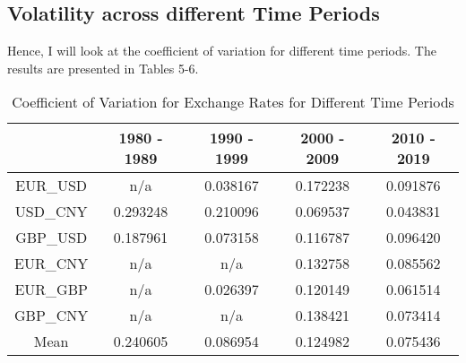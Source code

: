 \documentclass{article}
\begin{document}
\subsection{Volatility across different Time Periods}
Hence, I will look at the coefficient of variation for different time periods. The results are presented in Tables 5-6.


\begin{table}[H]
    \centering
    \caption{Coefficient of Variation for Exchange Rates for Different Time Periods}
    \begin{tabular}{ccccc}
        \hline
        {} &  1980 - 1989 &  1990 - 1999 &  2000 - 2009 &  2010 - 2019 \\
        \hline
        EUR\_USD &          n/a &     0.038167 &     0.172238 &     0.091876 \\
        USD\_CNY &     0.293248 &     0.210096 &     0.069537 &     0.043831 \\
        GBP\_USD &     0.187961 &     0.073158 &     0.116787 &     0.096420 \\
        EUR\_CNY &          n/a &          n/a &     0.132758 &     0.085562 \\
        EUR\_GBP &          n/a &     0.026397 &     0.120149 &     0.061514 \\
        GBP\_CNY &          n/a &          n/a &     0.138421 &     0.073414 \\
        Mean    &     0.240605 &     0.086954 &     0.124982 &     0.075436 \\
        \hline
    \end{tabular}
\end{table}
\end{document}
